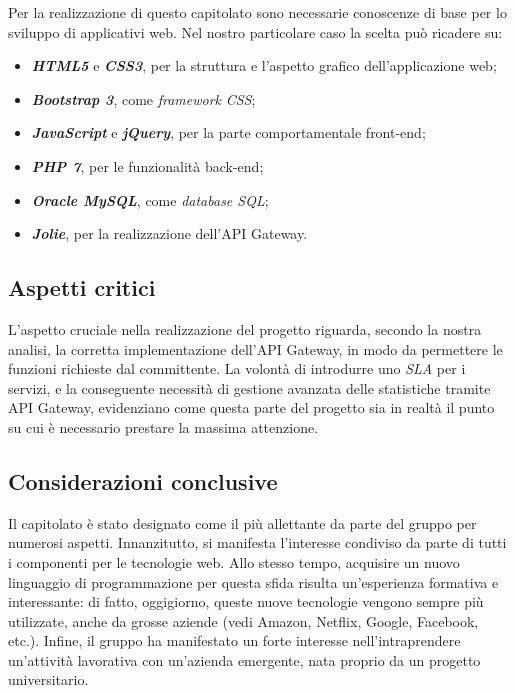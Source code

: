 Per la realizzazione di questo capitolato sono necessarie conoscenze di base per lo sviluppo di applicativi web. Nel nostro particolare caso la scelta può ricadere su:
\begin{itemize}
	\item \textbf{\textit{HTML5}} e \textbf{\textit{CSS3}}, per la struttura e l'aspetto grafico dell'applicazione web;
	\item \textbf{\textit{Bootstrap 3}}, come \textit{framework} \textit{CSS};
	\item \textbf{\textit{JavaScript}} e \textbf{\textit{jQuery}}, per la parte comportamentale front-end;
	\item \textbf{\textit{PHP 7}}, per le funzionalità back-end;
	\item \textbf{\textit{Oracle MySQL}}, come \textit{database SQL};
	\item \textbf{\textit{Jolie}}, per la realizzazione dell'API Gateway.
\end{itemize}

\subsection{Aspetti critici}

L'aspetto cruciale nella realizzazione del progetto riguarda, secondo la nostra analisi, la corretta implementazione dell'API Gateway, in modo da permettere le funzioni richieste dal committente. La volontà di introdurre uno \textit{SLA} per i servizi, e la conseguente necessità di gestione avanzata delle statistiche tramite API Gateway, evidenziano come questa parte del progetto sia in realtà il punto su cui è necessario prestare la massima attenzione.

\subsection{Considerazioni conclusive}

Il capitolato è stato designato come il più allettante da parte del gruppo per numerosi aspetti. Innanzitutto, si manifesta l'interesse condiviso da parte di tutti i componenti per le tecnologie web. Allo stesso tempo, acquisire un nuovo linguaggio
di programmazione per questa sfida risulta un'esperienza
formativa e interessante: di fatto, oggigiorno, queste nuove tecnologie vengono sempre più utilizzate, anche da grosse aziende (vedi Amazon, Netflix, Google, Facebook, etc.). Infine, il gruppo ha manifestato un forte interesse nell'intraprendere un'attività lavorativa con un'azienda emergente, nata proprio da un progetto universitario.